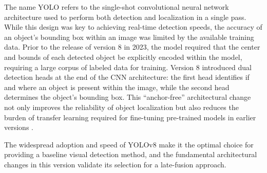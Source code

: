 \documentclass{erauthesis}
\begin{document}
The name YOLO refers to the single-shot convolutional neural network architecture used to perform both detection and localization in a single pass.
While this design was key to achieving real-time detection speeds, the accuracy of an object’s bounding box within an image was limited by the available training data. 
Prior to the release of version 8 in 2023, the model required that the center and bounds of each detected object be explicitly encoded within the model, requiring a large corpus of labeled data for training.
Version 8 introduced dual detection heads at the end of the CNN architecture: the first head identifies if and where an object is present within the image, while the second head determines the object's bounding box.
This “anchor-free” architectural change not only improves the reliability of object localization but also reduces the burden of transfer learning required for fine-tuning pre-trained models in earlier versions \cite{terven2023, ultralytics}.

The widespread adoption and speed of YOLOv8 make it the optimal choice for providing a baseline visual detection method, and the fundamental architectural changes in this version validate its selection for a late-fusion approach.









\end{document}
